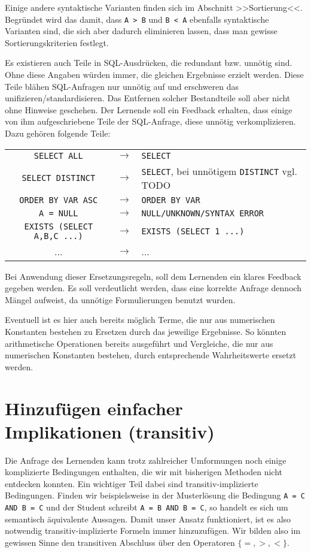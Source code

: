 Einige andere syntaktische Varianten finden sich im Abschnitt >>Sortierung<<. Begründet wird das damit, dass \verb|A > B| und \verb|B < A| ebenfalls syntaktische Varianten sind, die sich aber dadurch eliminieren lassen, dass man gewisse Sortierungskriterien festlegt.

Es existieren auch Teile in SQL-Ausdrücken, die redundant bzw. unnötig sind. Ohne diese Angaben würden immer, die gleichen Ergebnisse erzielt werden. Diese Teile blähen SQL-Anfragen nur unnötig auf und erschweren das unifizieren/standardisieren. Das Entfernen solcher Bestandteile soll aber nicht ohne Hinweise geschehen. Der Lernende soll ein Feedback erhalten, dass einige von ihm aufgeschriebene Teile der SQL-Anfrage, diese unnötig verkomplizieren. Dazu gehören folgende Teile:

\begin{tabular}{ccl}
\verb|SELECT ALL| & $\to$ & \verb|SELECT|\\
\verb|SELECT DISTINCT| & $\to$ & \verb|SELECT|, bei unnötigem \verb|DISTINCT| vgl. TODO\\
\verb|ORDER BY VAR ASC| &  $\to$ & \verb|ORDER BY VAR|\\
\verb|A = NULL| & $\to$ & \verb|NULL/UNKNOWN/SYNTAX ERROR|\\
\verb|EXISTS (SELECT A,B,C ...)| & $\to$ & \verb|EXISTS (SELECT 1 ...)|\\
... & $\to$ & ...\\
\end{tabular}

Bei Anwendung dieser Ersetzungsregeln, soll dem Lernenden ein klares Feedback gegeben werden. Es soll verdeutlicht werden, dass eine korrekte Anfrage dennoch Mängel aufweist, da unnötige Formulierungen benutzt wurden.

Eventuell ist es hier auch bereits möglich Terme, die nur aus numerischen Konstanten bestehen zu Ersetzen durch das jeweilige Ergebnisse. So könnten arithmetische Operationen bereits ausgeführt und Vergleiche, die nur aus numerischen Konstanten bestehen, durch entsprechende Wahrheitswerte ersetzt werden.



\section{Hinzufügen einfacher Implikationen (transitiv)}

Die Anfrage des Lernenden kann trotz zahlreicher Umformungen noch einige komplizierte Bedingungen enthalten, die wir mit bisherigen Methoden nicht entdecken konnten. Ein wichtiger Teil dabei sind transitiv-implizierte Bedingungen. Finden wir beispielsweise in der Musterlösung die Bedingung \verb|A = C AND B = C| und der Student schreibt \verb|A = B AND B = C|, so handelt es sich um semantisch äquivalente Aussagen. Damit unser Ansatz funktioniert, ist es also notwendig transitiv-implizierte Formeln immer hinzuzufügen. Wir bilden also im gewissen Sinne den transitiven Abschluss über den Operatoren $\{=,>,<\}$.

